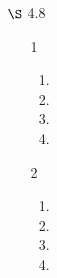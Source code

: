 \documentclass[12pt,letterpaper]{article}
\begin{document}
\begin{enumerate}
    \item [$\S$ 4.8]
      \begin{enumerate}
        \item [1]
          \begin{enumerate}[label=(\arabic*)]
            \item
            \item
            \item
            \item
          \end{enumerate}
        \item [2]
          \begin{enumerate}[label=(\arabic*)]
            \item
            \item
            \item
            \item
          \end{enumerate}
      \end{enumerate}

  \end{enumerate}
\end{document}
